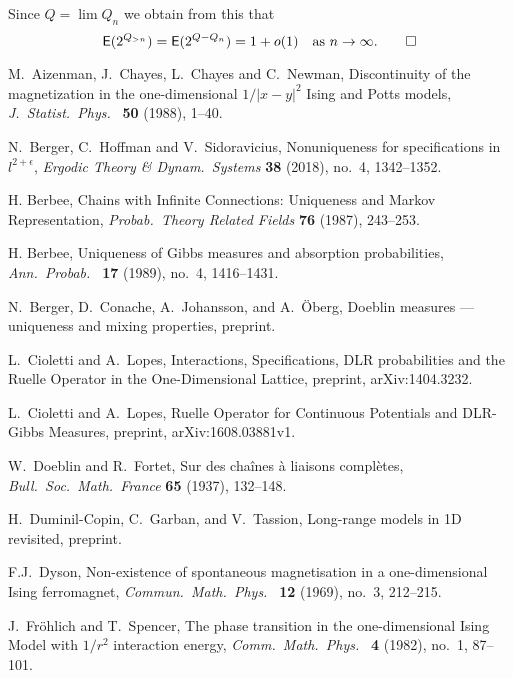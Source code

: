 \documentclass[11pt, a4paper]{amsart}
\theoremstyle{definition}
\theoremstyle{remark}
\providecommand{\E}{\mathsf{E}}
\begin{document}
Since $Q = \lim Q_n$ we obtain from this that
\[
  \E(2^{Q_{>n}}) = \E(2^{Q-Q_n}) = 1+o(1) \quad\text{as $n\to\infty$.} \qed
\]





\begin{thebibliography}{999}

 M.\ Aizenman, J.\ Chayes, L.\ Chayes and C.\ Newman,
  Discontinuity of the magnetization in the one-dimensional
  $1/|x-y|^2$ Ising and Potts models, {\em J.\  Statist.\ Phys.\  } {\bf
    50} (1988), 1--40.
    
  N.\ Berger, C.\ Hoffman and V.\ Sidoravicius,
  Nonuniqueness for specifications in $l^{2+\epsilon}$,
  {\em Ergodic Theory \& Dynam.\ Systems} {\bf 38}
  (2018), no.\ 4, 1342--1352.   

 H. Berbee, Chains with Infinite Connections:
  Uniqueness and Markov Representation, {\em Probab.\ Theory Related
    Fields} {\bf 76} (1987), 243--253.
 
 H. Berbee, Uniqueness of Gibbs measures and
  absorption probabilities, {\em Ann.\ Probab.\ } {\bf 17} (1989),
  no.\ 4, 1416--1431.
 
N.\ Berger, D.\ Conache, A.\ Johansson, and A.\ \"Oberg, Doeblin measures --- uniqueness and mixing properties,
preprint. 
 
 L.\ Cioletti and A.\ Lopes, Interactions,
  Specifications, DLR probabilities and the Ruelle Operator in the
  One-Dimensional Lattice, preprint, arXiv:1404.3232.
 
 L.\ Cioletti and A.\ Lopes, Ruelle Operator for
  Continuous Potentials and DLR-Gibbs Measures, preprint,
  arXiv:1608.03881v1.
  
 W.\ Doeblin and R.\ Fortet, Sur des cha{\^i}nes
  {\`a} liaisons compl{\`e}tes, {\em Bull.\ Soc.\ Math.\ France} {\bf
    65} (1937), 132--148.
  
H.\ Duminil-Copin, C.\ Garban, and V.\ Tassion, Long-range models in 1D revisited, preprint.

 F.J.\ Dyson, Non-existence of spontaneous
  magnetisation in a one-dimensional Ising ferromagnet, {\em Commun.\
    Math.\ Phys.\ } {\bf 12} (1969), no.\ 3, 212--215.  

 
 J.\ Fr\"ohlich and T.\ Spencer, The phase transition in
  the one-dimensional Ising Model with $1/r^2$ interaction energy,
  {\em Comm.\ Math.\ Phys.\ } {\bf 4} (1982), no.\ 1, 87--101.


\end{thebibliography}
\end{document}
